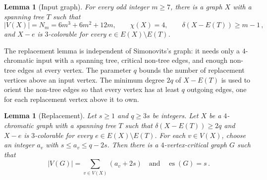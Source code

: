 \documentclass[11pt,letterpaper]{article}
\numberwithin{equation}{section}
\theoremstyle{plain}
\newtheorem{lemma}[theorem]{Lemma}
\theoremstyle{definition}
\theoremstyle{remark}
\DeclareMathOperator{\es}{es}
\newcommand{\N}[1]{N_{#1}}
\begin{document}
\begin{lemma}[Input graph]\label{lem:input}
For every odd integer $m\ge 7$, there is a graph $X$ with a spanning tree $T$ such that
\begin{equation}\label{eq:input-properties}
  |V(X)|=\N{m}=6m^3+6m^2+12m,\qquad \chi(X)=4,\qquad \delta(X-E(T))\ge m-1\,,
\end{equation}
and $X-e$ is $3$-colorable for every $e\in E(X)\setminus E(T)$.
\end{lemma}

The replacement lemma is independent of Simonovits's graph: it needs only a $4$-chromatic input with a spanning tree, critical non-tree edges, and enough non-tree edges at every vertex. The parameter $q$ bounds the number of replacement vertices above an input vertex. The minimum degree $2q$ of $X-E(T)$ is used to orient the non-tree edges so that every vertex has at least $q$ outgoing edges, one for each replacement vertex above it to own.

\begin{lemma}[Replacement]\label{lem:replacement}
Let $s\ge 1$ and $q\ge 3s$ be integers. Let $X$ be a $4$-chromatic graph with a spanning tree $T$ such that $\delta(X-E(T))\ge 2q$ and $X-e$ is $3$-colorable for every $e\in E(X)\setminus E(T)$. For each $v\in V(X)$, choose an integer $a_v$ with $s\le a_v\le q-2s$. Then there is a $4$-vertex-critical graph $G$ such that
\begin{equation*}
  |V(G)|=\sum_{v\in V(X)}(a_v+2s)\quad\mbox{and}\quad \es(G)=s\,.
\end{equation*}
\end{lemma}
\end{document}
